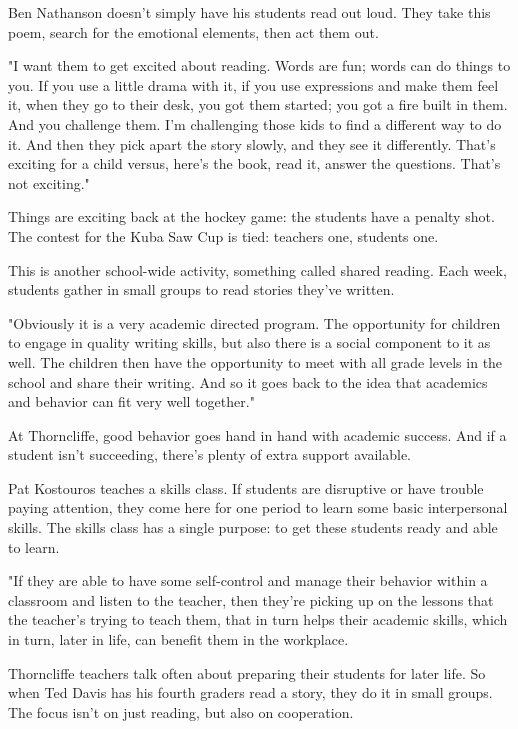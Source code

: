 Ben Nathanson doesn't simply have his students read out loud. They take this poem, search for the emotional elements, then act them out.

"I want them to get excited about reading. Words are fun; words can do things to you. If you use a little drama with it, if you use expressions and make them feel it, when they go to their desk, you got them started; you got a fire built in them. And you challenge them. I'm challenging those kids to find a different way to do it. And then they pick apart the story slowly, and they see it differently. That's exciting for a child versus, here's the book, read it, answer the questions. That's not exciting."

Things are exciting back at the hockey game: the students have a penalty shot. The contest for the Kuba Saw Cup is tied: teachers one, students one.

This is another school-wide activity, something called shared reading. Each week, students gather in small groups to read stories they've written.

"Obviously it is a very academic directed program. The opportunity for children to engage in quality writing skills, but also there is a social component to it as well. The children then have the opportunity to meet with all grade levels in the school and share their writing. And so it goes back to the idea that academics and behavior can fit very well together."

At Thorncliffe, good behavior goes hand in hand with academic success. And if a student isn't succeeding, there's plenty of extra support available.

Pat Kostouros teaches a skills class. If students are disruptive or have trouble paying attention, they come here for one period to learn some basic interpersonal skills. The skills class has a single purpose: to get these students ready and able to learn.

"If they are able to have some self-control and manage their behavior within a classroom and listen to the teacher, then they're picking up on the lessons that the teacher's trying to teach them, that in turn helps their academic skills, which in turn, later in life, can benefit them in the workplace.

Thorncliffe teachers talk often about preparing their students for later life. So when Ted Davis has his fourth graders read a story, they do it in small groups. The focus isn't on just reading, but also on cooperation.

